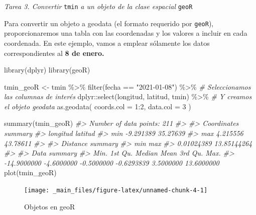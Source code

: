 \documentclass[
]{report}
\newenvironment{Shaded}{\begin{snugshade}}{\end{snugshade}}
\newcommand{\AttributeTok}[1]{\textcolor[rgb]{0.77,0.63,0.00}{#1}}
\newcommand{\CommentTok}[1]{\textcolor[rgb]{0.56,0.35,0.01}{\textit{#1}}}
\newcommand{\DecValTok}[1]{\textcolor[rgb]{0.00,0.00,0.81}{#1}}
\newcommand{\FunctionTok}[1]{\textcolor[rgb]{0.00,0.00,0.00}{#1}}
\newcommand{\NormalTok}[1]{#1}
\newcommand{\OtherTok}[1]{\textcolor[rgb]{0.56,0.35,0.01}{#1}}
\newcommand{\SpecialCharTok}[1]{\textcolor[rgb]{0.00,0.00,0.00}{#1}}
\newcommand{\StringTok}[1]{\textcolor[rgb]{0.31,0.60,0.02}{#1}}
\theoremstyle{definition}
\theoremstyle{definition}
\theoremstyle{definition}
\theoremstyle{definition}
\theoremstyle{remark}
\begin{document}
\emph{Tarea 3. Convertir} \texttt{tmin} \emph{a un objeto de la clase espacial} \texttt{geoR}

Para convertir un objeto a geodata (el formato requerido por \texttt{geoR}),
proporcionaremos una tabla con las coordenadas y los valores a incluir en cada
coordenada. En este ejemplo, vamos a emplear sólamente los datos
correspondientes al \textbf{8 de enero.}

\begin{Shaded}
\begin{Highlighting}[]
\FunctionTok{library}\NormalTok{(dplyr)}
\FunctionTok{library}\NormalTok{(geoR)}

\NormalTok{tmin\_geoR }\OtherTok{\textless{}{-}}\NormalTok{ tmin }\SpecialCharTok{\%\textgreater{}\%}
  \FunctionTok{filter}\NormalTok{(fecha }\SpecialCharTok{==} \StringTok{"2021{-}01{-}08"}\NormalTok{) }\SpecialCharTok{\%\textgreater{}\%}
  \CommentTok{\# Seleccionamos las columnas de interés}
\NormalTok{  dplyr}\SpecialCharTok{::}\FunctionTok{select}\NormalTok{(longitud, latitud, tmin) }\SpecialCharTok{\%\textgreater{}\%}
  \CommentTok{\# Y creamos el objeto geodata}
  \FunctionTok{as.geodata}\NormalTok{(}
    \AttributeTok{coords.col =} \DecValTok{1}\SpecialCharTok{:}\DecValTok{2}\NormalTok{,}
    \AttributeTok{data.col =} \DecValTok{3}
\NormalTok{  )}


\FunctionTok{summary}\NormalTok{(tmin\_geoR)}
\CommentTok{\#\textgreater{} Number of data points: 211 }
\CommentTok{\#\textgreater{} }
\CommentTok{\#\textgreater{} Coordinates summary}
\CommentTok{\#\textgreater{}      longitud  latitud}
\CommentTok{\#\textgreater{} min {-}9.291389 35.27639}
\CommentTok{\#\textgreater{} max  4.215556 43.78611}
\CommentTok{\#\textgreater{} }
\CommentTok{\#\textgreater{} Distance summary}
\CommentTok{\#\textgreater{}         min         max }
\CommentTok{\#\textgreater{}  0.01024389 13.85144264 }
\CommentTok{\#\textgreater{} }
\CommentTok{\#\textgreater{} Data summary}
\CommentTok{\#\textgreater{}        Min.     1st Qu.      Median        Mean     3rd Qu.        Max. }
\CommentTok{\#\textgreater{} {-}14.9000000  {-}4.6000000  {-}0.5000000  {-}0.6293839   3.5000000  13.6000000}
\FunctionTok{plot}\NormalTok{(tmin\_geoR)}
\end{Highlighting}
\end{Shaded}

\begin{figure}

{\centering \texttt{[image: \_main\_files/figure-latex/unnamed-chunk-4-1]} 

}

\caption{Objetos en geoR}\label{fig:unnamed-chunk-4}
\end{figure}
\end{document}
